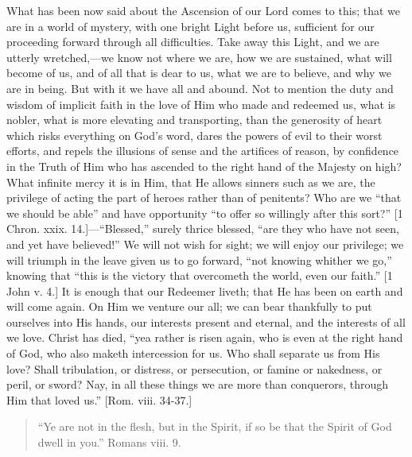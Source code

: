 What has been now said about the Ascension of our Lord comes to this;
that we are in a world of mystery, with one bright Light before us,
sufficient for our proceeding forward through all difficulties. Take
away this Light, and we are utterly wretched,—we know not where we
are, how we are sustained, what will become of us, and of all that is
dear to us, what we are to believe, and why we are in being. But with it
we have all and abound. Not to mention the duty and wisdom of implicit
faith in the love of Him who made and redeemed us, what is nobler, what
is more elevating and transporting, than the generosity of heart which
risks everything on God's word, dares the powers of evil to their worst
efforts, and repels the illusions of sense and the artifices of reason,
by confidence in the Truth of Him who has ascended to the right hand of
the Majesty on high? What infinite mercy it is in Him, that He allows
sinners such as we are, the privilege of acting the part of heroes
rather than of penitents? Who are we ``that we should be able''
and have opportunity ``to offer so willingly after this sort?''
[1 Chron. xxix. 14.]—``Blessed,'' surely thrice blessed,
``are they who have not seen, and yet have believed!'' We will
not wish for sight; we will enjoy our privilege; we will triumph in the
leave given us to go forward, ``not knowing whither we go,''
knowing that ``this is the victory that overcometh the world, even
our faith.'' [1 John v. 4.] It is enough that our Redeemer liveth;
that He has been on earth and will come again. On Him we venture our
all; we can bear thankfully to put ourselves into His hands, our
interests present and eternal, and the interests of all we love. Christ
has died, ``yea rather is risen again, who is even at the right hand
of God, who also maketh intercession for us. Who shall separate us from
His love? Shall tribulation, or distress, or persecution, or famine or
nakedness, or peril, or sword? Nay, in all these things we are more than
conquerors, through Him that loved us.'' [Rom. viii. 34-37.]


\begin{quote}

``Ye are not in the flesh, but in the Spirit, if so be that the
Spirit of God dwell in you.'' Romans viii. 9.

\end{quote}

